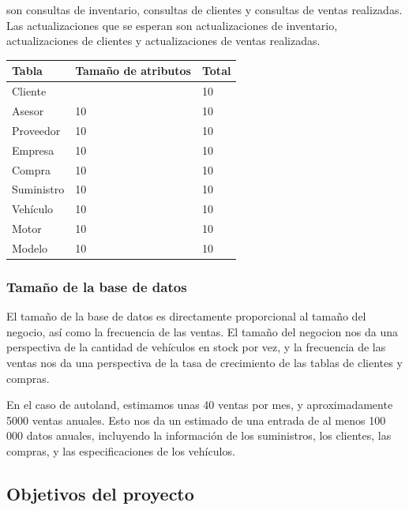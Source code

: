 \documentclass[12pt]{article}
\begin{document}
son consultas de inventario, consultas de clientes y consultas de ventas realizadas. Las actualizaciones que se esperan son actualizaciones de inventario, actualizaciones de clientes y actualizaciones de ventas realizadas.

\begin{tabular}{|l|l|l|}
\hline
\textbf{Tabla} & \textbf{Tamaño de atributos} & \textbf{Total} \\ \hline
Cliente       &                            & 10             \\ \hline
Asesor        & 10                           & 10             \\ \hline
Proveedor     & 10                           & 10             \\ \hline
Empresa       & 10                           & 10             \\ \hline
Compra        & 10                           & 10             \\ \hline
Suministro    & 10                           & 10             \\ \hline
Vehículo      & 10                           & 10             \\ \hline
Motor         & 10                           & 10             \\ \hline
Modelo        & 10                           & 10             \\ \hline
\end{tabular}
\subsubsection{Tama\~no de la base de datos}

El tamaño de la base de datos es directamente proporcional al tamaño del negocio, así como la frecuencia de las ventas. El tamaño del negocion nos da una perspectiva de la cantidad de vehículos en stock por vez, y la frecuencia de las ventas nos da una perspectiva de la tasa de crecimiento de las tablas de clientes y compras.

En el caso de autoland, estimamos unas 40 ventas por mes, y aproximadamente 5000 ventas anuales. Esto nos da un estimado de una entrada de al menos 100 000 datos anuales, incluyendo la información de los suministros, los clientes, las compras, y las especificaciones de los vehículos.

\subsection{Objetivos del proyecto}
\end{document}
